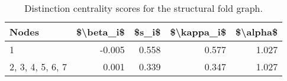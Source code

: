 \begin{table}
\centering
\caption{\label{tab:sf}Distinction centrality scores for the structural fold graph.}
\centering
\begin{tabular}[t]{lrrrr}
\toprule
Nodes & \$\textbackslash{}beta\_i\$ & \$s\_i\$ & \$\textbackslash{}kappa\_i\$ & \$\textbackslash{}alpha\$\\
\midrule
1 & -0.005 & 0.558 & 0.577 & 1.027\\
2, 3, 4, 5, 6, 7 & 0.001 & 0.339 & 0.347 & 1.027\\
\bottomrule
\end{tabular}
\end{table}
